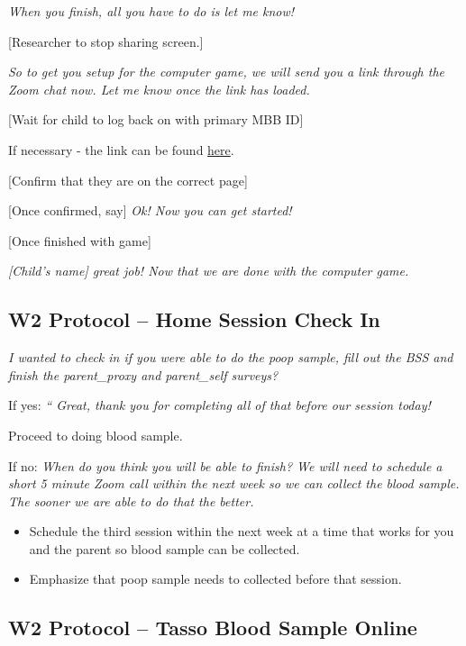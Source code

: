 \documentclass[]{book}
\begin{document}
\emph{When you finish, all you have to do is let me know!}

{[}Researcher to stop sharing screen.{]}

\emph{So to get you setup for the computer game, we will send you a link through the Zoom chat now. Let me know once the link has loaded.}

{[}Wait for child to log back on with primary MBB ID{]}

If necessary - the link can be found \href{https://research.sc/participant/login/20451/publicid}{here}.

{[}Confirm that they are on the correct page{]}

{[}Once confirmed, say{]} \emph{Ok! Now you can get started!}

{[}Once finished with game{]}

\emph{{[}Child's name{]} great job! Now that we are done with the computer game.}

\hypertarget{w2-protocol-home-session-check-in}{%
\subsection{W2 Protocol -- Home Session Check In}\label{w2-protocol-home-session-check-in}}

\emph{I wanted to check in if you were able to do the poop sample, fill out the BSS and finish the parent\_proxy and parent\_self surveys?}

If yes: \emph{`` Great, thank you for completing all of that before our session today!}

Proceed to doing blood sample.

If no: \emph{When do you think you will be able to finish? We will need to schedule a short 5 minute Zoom call within the next week so we can collect the blood sample. The sooner we are able to do that the better.}

\begin{itemize}
\item
  Schedule the third session within the next week at a time that works for you and the parent so blood sample can be collected.
\item
  Emphasize that poop sample needs to collected before that session.
\end{itemize}

\hypertarget{w2-protocol-tasso-blood-sample-online}{%
\subsection{W2 Protocol -- Tasso Blood Sample Online}\label{w2-protocol-tasso-blood-sample-online}}
\end{document}
